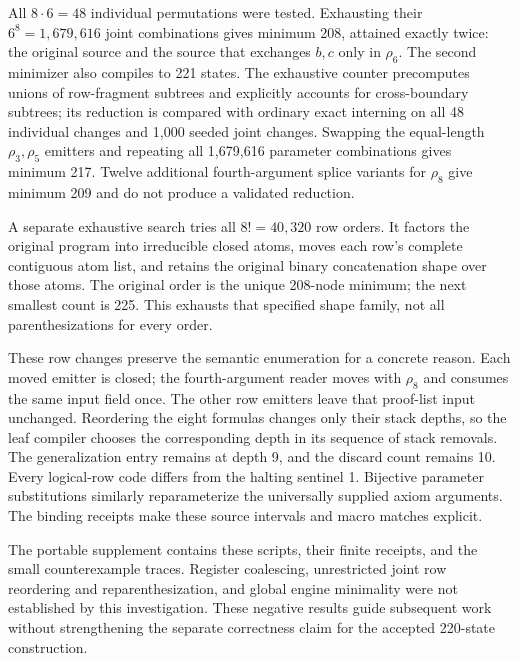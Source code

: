All $8\cdot6=48$ individual permutations were tested.  Exhausting their
$6^8=1,679,616$ joint combinations gives minimum 208, attained exactly twice:
the original source and the source that exchanges $b,c$ only in $\rho_6$.
The second minimizer also compiles to 221 states.  The exhaustive counter
precomputes unions of row-fragment subtrees and explicitly accounts for
cross-boundary subtrees; its reduction is compared with ordinary exact
interning on all 48 individual changes and 1,000 seeded joint changes.
Swapping the equal-length $\rho_3,\rho_5$ emitters and repeating all
1,679,616 parameter combinations gives minimum 217.  Twelve additional
fourth-argument splice variants for $\rho_8$ give minimum 209 and do not
produce a validated reduction.

A separate exhaustive search tries all $8!=40,320$ row orders.  It factors
the original program into irreducible closed atoms, moves each row's complete
contiguous atom list, and retains the original binary concatenation shape
over those atoms.  The original order is the unique 208-node minimum; the
next smallest count is 225.  This exhausts that specified shape family,
not all parenthesizations for every order.

These row changes preserve the semantic enumeration for a concrete reason.
Each moved emitter is closed; the fourth-argument reader moves with
$\rho_8$ and consumes the same input field once.  The other row emitters leave
that proof-list input unchanged.  Reordering the eight formulas changes only
their stack depths, so the leaf compiler chooses the corresponding depth in
its sequence of stack removals.  The generalization entry remains at depth
9, and the discard count remains 10.  Every logical-row code differs from
the halting sentinel 1.  Bijective parameter substitutions similarly
reparameterize the universally supplied axiom arguments.  The binding
receipts make these source intervals and macro matches explicit.

The portable supplement contains these scripts, their finite receipts, and
the small counterexample traces.  Register coalescing, unrestricted joint
row reordering and reparenthesization, and global engine minimality were
not established by this investigation.  These negative results guide
subsequent work without strengthening the separate correctness claim for
the accepted 220-state construction.
